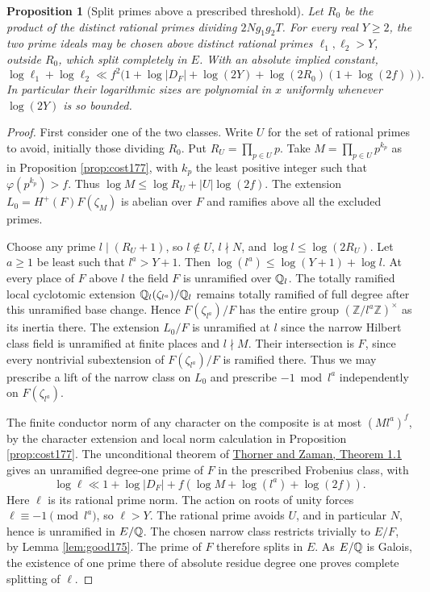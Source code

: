 \documentclass[a4paper,11pt]{article}
\newtheorem{proposition}{Proposition}[section]
\theoremstyle{definition}
\theoremstyle{remark}
\newcommand{\ZZ}{\mathbb Z}\newcommand{\ord}{\operatorname{ord}}
\numberwithin{equation}{section}
\begin{document}
\begin{proposition}[Split primes above a prescribed threshold]
\label{prop:high183}
Let \(R_0\) be the product of the distinct rational primes
dividing \(2Ng_1g_2T\). For every real \(Y\ge2\), the two
prime ideals may be chosen above distinct rational primes
\(\ell_1,\ell_2>Y\), outside \(R_0\), which split
completely in \(E\). With an absolute implied constant,
\[
 \log\ell_1+\log\ell_2\ll
      f^2\big(1+\log|D_F|+\log(2Y)
         +\log(2R_0)(1+\log(2f))\big).
\]
In particular their logarithmic sizes are polynomial in
\(x\) uniformly whenever \(\log(2Y)\) is so bounded.
\end{proposition}
\begin{proof}
First consider one of the two classes. Write \(U\) for the
set of rational primes to avoid, initially those dividing
\(R_0\). Put \(R_U=\prod_{p\in U}p\). Take \(M=\prod_{p\in U}
p^{k_p}\) as in
Proposition \ref{prop:cost177},
with \(k_p\) the least positive integer such that
\(\varphi(p^{k_p})>f\). Thus
\(\log M\le\log R_U+|U|\log(2f)\).
The extension \(L_0=H^+(F)F(\zeta_M)\) is abelian over
\(F\) and ramifies above all the excluded primes.

Choose any prime \(l\mid (R_U+1)\), so \(l\notin U\),
\(l\nmid N\), and \(\log l\le\log(2R_U)\).
Let \(a\ge1\) be least such that \(l^a>Y+1\).
Then \(\log(l^a)\le\log(Y+1)+\log l\).
At every place of \(F\) above \(l\) the field \(F\) is
unramified over \(\mathbb Q_l\). The totally ramified local
cyclotomic extension \(\mathbb Q_l(\zeta_{l^a})/\mathbb Q_l\) remains
totally ramified of full degree after this unramified
base change. Hence \(F(\zeta_{l^a})/F\) has the entire
group \((\ZZ/l^a\ZZ)^\times\) as its inertia there.
The extension \(L_0/F\) is unramified at \(l\) since the narrow
Hilbert class field is unramified at finite places and
\(l\nmid M\). Their intersection is \(F\), since every
nontrivial subextension of \(F(\zeta_{l^a})/F\) is
ramified there. Thus we may prescribe a lift of the narrow
class on \(L_0\) and prescribe \(-1\bmod l^a\) independently
on \(F(\zeta_{l^a})\).

The finite conductor norm of any character on the composite
is at most \((Ml^a)^f\), by the character extension and
local norm calculation in Proposition \ref{prop:cost177}.
The unconditional theorem of
\href{https://arxiv.org/pdf/1604.01750}{Thorner and Zaman,
Theorem 1.1} gives an unramified degree-one prime of \(F\)
in the prescribed Frobenius class, with
\[
    \log\ell\ll1+\log|D_F|+
               f(\log M+\log(l^a)+\log(2f)).
\]
Here \(\ell\) is its rational prime norm. The action on
roots of unity forces \(\ell\equiv-1\pmod{l^a}\), so
\(\ell>Y\). The rational prime avoids \(U\), and in
particular \(N\), hence is unramified in \(E/\mathbb Q\).
The chosen narrow class restricts trivially to \(E/F\),
by Lemma \ref{lem:good175}. The prime of \(F\) therefore
splits in \(E\). As \(E/\mathbb Q\) is Galois, the existence of
one prime there of absolute residue degree one proves
complete splitting of \(\ell\).


\end{proof}
\end{document}
